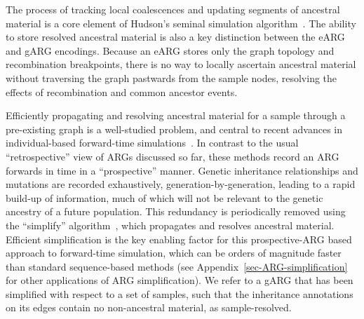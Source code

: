 \documentclass{article}
\begin{document}
The process of tracking local coalescences and updating
segments of ancestral material is a core element of
Hudson's seminal simulation
algorithm~\citep{hudson1983testing,kelleher2016efficient}.
The ability to store resolved ancestral material
is also a key distinction between the eARG and gARG
encodings. Because an eARG stores only the graph topology and
recombination breakpoints, there is no way to locally
ascertain ancestral material without traversing the graph
pastwards from the sample nodes,
resolving the effects of recombination and common ancestor events.

Efficiently propagating and resolving ancestral material for
a sample through a pre-existing graph is a well-studied problem,
and central to recent advances in individual-based forward-time
simulations~\citep{kelleher2018efficient,haller2018tree}.
In contrast to the usual ``retrospective'' view of ARGs
discussed so far, these methods record an ARG forwards in
time in a ``prospective'' manner. Genetic inheritance relationships
and mutations are recorded exhaustively, generation-by-generation,
leading to a rapid build-up of information, much of which
will not be relevant to the genetic ancestry of a future population.
This redundancy is periodically removed using the ``simplify''
algorithm~\citep{kelleher2018efficient}, which propagates and
resolves ancestral material.
Efficient simplification is the key enabling factor for
this prospective-ARG based approach to forward-time simulation,
which can be orders of magnitude faster than standard
sequence-based methods
(see Appendix~\ref{sec-ARG-simplification} for
other applications of ARG simplification).
We refer to a gARG that has been simplified with respect to a set of
samples, such that the inheritance annotations on its edges contain
no non-ancestral material,  as sample-resolved.
\end{document}
